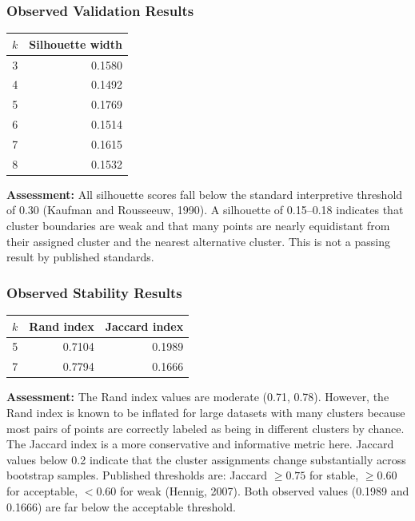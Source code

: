 \documentclass[11pt]{article}
\begin{document}
\subsubsection{Observed Validation Results}

\begin{center}
\begin{tabular}{|c|r|}
\hline
$k$ & Silhouette width \\
\hline
3 & 0.1580 \\
4 & 0.1492 \\
5 & 0.1769 \\
6 & 0.1514 \\
7 & 0.1615 \\
8 & 0.1532 \\
\hline
\end{tabular}
\end{center}

\textbf{Assessment:} All silhouette scores fall below the standard interpretive
threshold of 0.30 (Kaufman and Rousseeuw, 1990). A silhouette of 0.15--0.18 indicates
that cluster boundaries are weak and that many points are nearly equidistant from
their assigned cluster and the nearest alternative cluster. This is not a passing
result by published standards.

\subsubsection{Observed Stability Results}

\begin{center}
\begin{tabular}{|c|r|r|}
\hline
$k$ & Rand index & Jaccard index \\
\hline
5 & 0.7104 & 0.1989 \\
7 & 0.7794 & 0.1666 \\
\hline
\end{tabular}
\end{center}

\textbf{Assessment:} The Rand index values are moderate (0.71, 0.78). However,
the Rand index is known to be inflated for large datasets with many clusters
because most pairs of points are correctly labeled as being in different clusters
by chance. The Jaccard index is a more conservative and informative metric here.
Jaccard values below 0.2 indicate that the cluster assignments change substantially
across bootstrap samples. Published thresholds are: Jaccard $\geq 0.75$ for
stable, $\geq 0.60$ for acceptable, $< 0.60$ for weak (Hennig, 2007). Both
observed values (0.1989 and 0.1666) are far below the acceptable threshold.
\end{document}
